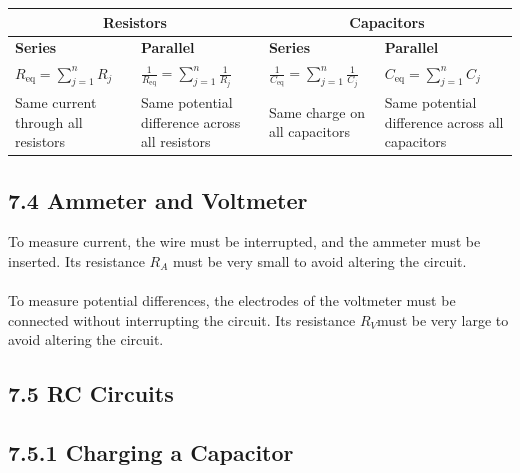 \documentclass[12pt, a4paper]{article}
\begin{document}
		\begin{table}[h]
			\centering
			\renewcommand{\arraystretch}{1.5} %
			\setlength{\tabcolsep}{5pt} %
			\begin{tabularx}{\textwidth}{|X|X|X|X|}
				\hline
				\multicolumn{2}{|c|}{\textbf{Resistors}} & \multicolumn{2}{c|}{\textbf{Capacitors}} \\
				\hline
				\textbf{Series} & \textbf{Parallel} & \textbf{Series} & \textbf{Parallel} \\
				\hline
				$ R_{\text{eq}} = \sum\limits_{j=1}^{n} R_j $ & 
				$ \frac{1}{R_{\text{eq}}} = \sum\limits_{j=1}^{n} \frac{1}{R_j} $ & 
				$ \frac{1}{C_{\text{eq}}} = \sum\limits_{j=1}^{n} \frac{1}{C_j} $ & 
				$ C_{\text{eq}} = \sum\limits_{j=1}^{n} C_j $ \\
				\hline
				Same current through all resistors & 
				Same potential difference across all resistors & 
				Same charge on all capacitors & 
				Same potential difference across all capacitors \\
				\hline
			\end{tabularx}
		\end{table}
		
		
		
		
		\subsection*{7.4 Ammeter and Voltmeter}
		 
		To measure current, the wire must be interrupted, and the ammeter must be inserted.
		Its resistance $R_A$ must be very small to avoid altering the circuit. \\\\
		To measure potential differences, the electrodes of the voltmeter must be connected without interrupting the circuit.
		Its resistance $R_V$​ must be very large to avoid altering the circuit.
		
		
		
		\subsection*{7.5 RC Circuits}
		
		\subsection*{7.5.1 Charging a Capacitor}
	
\end{document}
